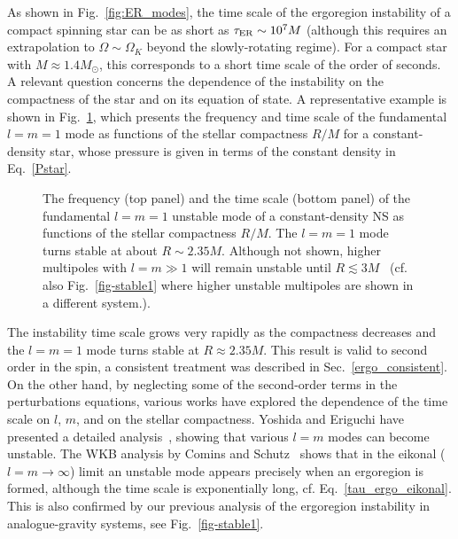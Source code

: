 \documentclass[11pt]{article}
\numberwithin{equation}{section} %
\begin{document}
As shown in Fig.~\ref{fig:ER_modes}, the time scale of the ergoregion instability of a compact spinning star can be as short as $\tau_{\rm ER}\sim 10^7 M$ (although this requires an extrapolation to $\Omega\sim\Omega_K$ beyond the slowly-rotating regime). For a compact star with $M\approx 1.4M_\odot$, this corresponds to a short time scale of the order of seconds.
A relevant question concerns the dependence of the instability on the compactness of the star and on its equation of state. A representative example is shown in Fig.~\ref{fig:ER_compactness}, which presents the frequency and time scale of the fundamental $l=m=1$ mode as functions of the stellar compactness $R/M$ for a constant-density star, whose pressure is given in terms of the constant density in Eq.~\eqref{Pstar}.
%
\begin{figure}[t]
\begin{center}
\caption{The frequency (top panel) and the time scale (bottom panel) of the fundamental $l=m=1$ unstable mode of a constant-density NS as functions of the stellar compactness $R/M$. The $l=m=1$ mode turns stable at about $R\sim 2.35 M$. Although not shown, higher multipoles with $l=m\gg1$ will remain unstable until $R\lesssim 3M$~\cite{CominsSchutz,1996MNRAS.282..580Y} (cf. also Fig.~\ref{fig-stable1} where higher unstable multipoles are shown in a different system.).
\label{fig:ER_compactness}}
\end{center}
\end{figure}
%

The instability time scale grows very rapidly as the compactness decreases and the $l=m=1$ mode turns stable at 
$R\approx 2.35 M$. This result is valid to second order in the spin, a consistent treatment was described in 
Sec.~\ref{ergo_consistent}. On the other hand, by neglecting some of the second-order terms in the perturbations 
equations, various works have explored the dependence of the time scale on $l$, $m$, and on the stellar compactness. 
Yoshida and Eriguchi have presented a detailed analysis~\cite{1996MNRAS.282..580Y}, showing that various $l=m$ modes can 
become unstable. 
%
The WKB analysis by Comins and Schutz~\cite{CominsSchutz} shows that in the eikonal ($l=m\to\infty$) limit an unstable mode appears precisely when an ergoregion is formed, although the time scale is exponentially long, cf. Eq.~\eqref{tau_ergo_eikonal}. This is also confirmed by our previous analysis of the ergoregion instability in analogue-gravity systems, see Fig.~\ref{fig-stable1}.
\end{document}
